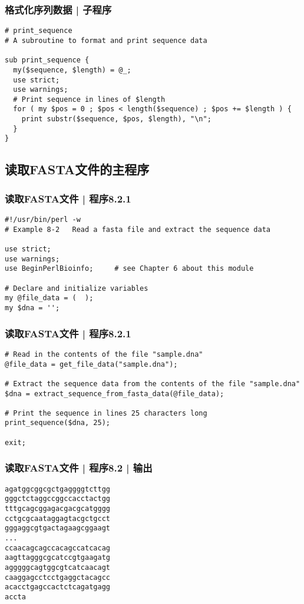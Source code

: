 \begin{frame}[fragile]
  \frametitle{格式化序列数据 | \alert{子程序}}
\begin{lstlisting}
# print_sequence
# A subroutine to format and print sequence data 

sub print_sequence {
  my($sequence, $length) = @_;
  use strict;
  use warnings;
  # Print sequence in lines of $length
  for ( my $pos = 0 ; $pos < length($sequence) ; $pos += $length ) {
    print substr($sequence, $pos, $length), "\n";
  }
}
\end{lstlisting}
\end{frame}

\subsection{读取FASTA文件的主程序}
\begin{frame}[fragile]
  \frametitle{读取FASTA文件 | 程序8.2.1}
\begin{lstlisting}[firstnumber=1]
#!/usr/bin/perl -w
# Example 8-2   Read a fasta file and extract the sequence data

use strict;
use warnings;
use BeginPerlBioinfo;     # see Chapter 6 about this module

# Declare and initialize variables
my @file_data = (  );
my $dna = '';
\end{lstlisting}
\end{frame}

\begin{frame}[fragile]
  \frametitle{读取FASTA文件 | 程序8.2.1}
\begin{lstlisting}[firstnumber=12]
# Read in the contents of the file "sample.dna"
@file_data = get_file_data("sample.dna");

# Extract the sequence data from the contents of the file "sample.dna"
$dna = extract_sequence_from_fasta_data(@file_data);

# Print the sequence in lines 25 characters long
print_sequence($dna, 25);

exit;
\end{lstlisting}
\end{frame}

\begin{frame}[fragile]
  \frametitle{读取FASTA文件 | 程序8.2 | 输出}
\begin{lstlisting}
agatggcggcgctgaggggtcttgg
gggctctaggccggccacctactgg
tttgcagcggagacgacgcatgggg
cctgcgcaataggagtacgctgcct
gggaggcgtgactagaagcggaagt
...
ccaacagcagccacagccatcacag
aagttagggcgcatccgtgaagatg
agggggcagtggcgtcatcaacagt
caaggagcctcctgaggctacagcc
acacctgagccactctcagatgagg
accta
\end{lstlisting}
\end{frame}

